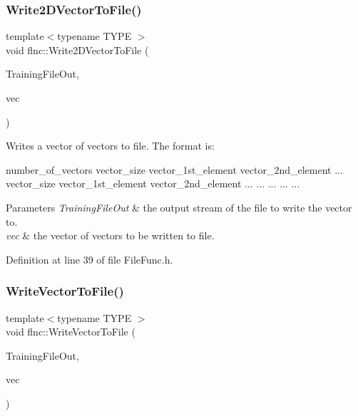 \mbox{\label{namespaceflnc_a5ee4b13fe9860b1398a2e2c8d07776c8}} 
\subsubsection{Write2\+D\+Vector\+To\+File()}
{\footnotesize\ttfamily template$<$typename T\+Y\+PE $>$ \\
void flnc\+::\+Write2\+D\+Vector\+To\+File (\begin{DoxyParamCaption}\item[{\textbf{ moutput\+\_\+stream} $\ast$}]{Training\+File\+Out,  }\item[{const std\+::vector$<$ std\+::vector$<$ T\+Y\+PE $>$ $>$ \&}]{vec }\end{DoxyParamCaption})}

Writes a vector of vectors to file. The format is\+: 
\begin{DoxyCode}
number\_of\_vectors
vector\_size vector\_1st\_element vector\_2nd\_element ...
vector\_size vector\_1st\_element vector\_2nd\_element ...
    ...            ...                ...         ...
\end{DoxyCode}



\begin{DoxyParams}{Parameters}
{\em Training\+File\+Out} & the output stream of the file to write the vector to. \\
\hline
{\em vec} & the vector of vectors to be written to file. \\
\hline
\end{DoxyParams}


Definition at line 39 of file File\+Func.\+h.

\mbox{\label{namespaceflnc_aa6a517635283780c9142bf6ad194013e}} 
\subsubsection{Write\+Vector\+To\+File()}
{\footnotesize\ttfamily template$<$typename T\+Y\+PE $>$ \\
void flnc\+::\+Write\+Vector\+To\+File (\begin{DoxyParamCaption}\item[{\textbf{ moutput\+\_\+stream} $\ast$}]{Training\+File\+Out,  }\item[{const std\+::vector$<$ T\+Y\+PE $>$ \&}]{vec }\end{DoxyParamCaption})}

